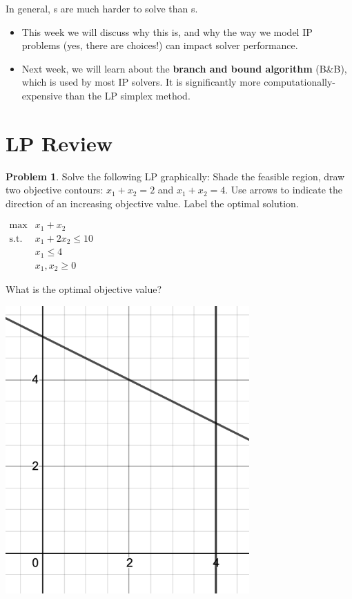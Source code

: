 \documentclass[11pt]{article}
\renewcommand{\labelitemi}{$\bullet$}
\theoremstyle{definition}
\newtheorem{problem}{Problem}
\newcommand{\answerbox}[3]{%
  \fbox{%
    \begin{minipage}[#1]{#2}
      \hfill\vspace{#3}
    \end{minipage}
  }
}
\newcommand{\catbox}{\answerbox{c}{.5in}{.7cm}}
\begin{document}
\begin{tcolorbox}
In general, \catbox s are much harder to solve than \catbox s.
\end{tcolorbox}

\renewcommand\labelitemi{$\bullet$}
\begin{itemize}
\item This week we will discuss why this is, and why the way we model IP problems (yes, there are choices!) can impact solver performance.
\item Next week, we will learn about the \textbf{branch and bound algorithm} (B\&B), which is used by most IP solvers.  It is significantly more computationally-expensive than the LP simplex method.
\end{itemize}

\section{LP Review}

\begin{problem}  
Solve the following LP graphically: Shade the feasible region, draw two objective contours:  $x_1 +x_2 =2$ and $x_1 + x_2 =4$.  Use arrows to indicate the direction of an increasing objective value.  Label the optimal solution.  

\begin{minipage}{0.6\textwidth}
$
\begin{array}{rl}
\text{max} & x_1+x_2 \\
\text{s.t.} & x_1+2x_2 \leq 10 \\
  & x_1  \leq  4 \\
  & x_1, x_2  \geq  0
\end{array}
$

\bigskip
What is the optimal objective value?
 \catbox
\end{minipage}
\begin{minipage}{0.4\textwidth}
\includegraphics[width=0.7\textwidth]{LP_graph}
\end{minipage}



\end{problem}
\bigskip
\end{document}
